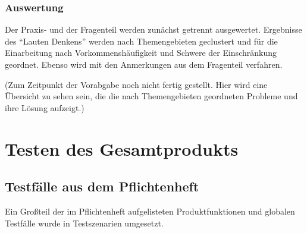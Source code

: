 \documentclass[parskip=full]{scrartcl}
\begin{document}
\subsubsection{Auswertung}

Der Praxis- und der Fragenteil werden zunächst getrennt ausgewertet. Ergebnisse des \enquote{Lauten Denkens} werden nach Themengebieten geclustert und für die Einarbeitung nach Vorkommenshäufigkeit und Schwere der Einschränkung geordnet. Ebenso wird mit den Anmerkungen aus dem Fragenteil verfahren.

(Zum Zeitpunkt der Vorabgabe noch nicht fertig gestellt. Hier wird eine Übersicht zu sehen sein, die die nach Themengebieten geordneten Probleme und ihre Lösung aufzeigt.)






\newpage
\section{Testen des Gesamtprodukts}\label{gesamthwsw}

%

\subsection{Testfälle aus dem Pflichtenheft}
Ein Großteil der im Pflichtenheft aufgelisteten Produktfunktionen und globalen Testfälle wurde in Testszenarien umgesetzt. 
\end{document}
